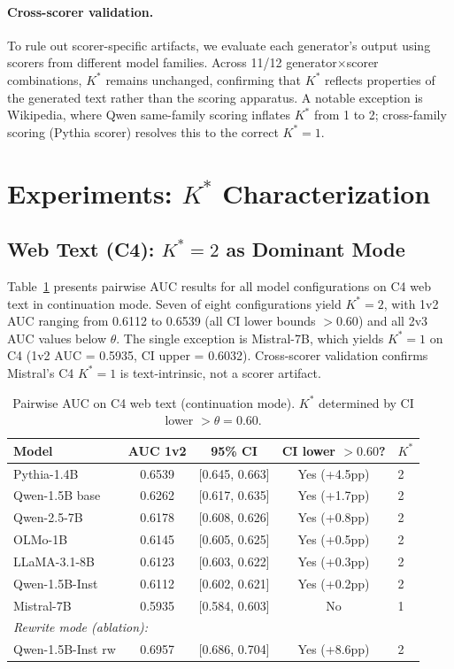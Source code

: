 \documentclass[11pt]{article}
\begin{document}
\paragraph{Cross-scorer validation.} To rule out scorer-specific artifacts, we evaluate each generator's output using scorers from different model families. Across 11/12 generator$\times$scorer combinations, $K^*$ remains unchanged, confirming that $K^*$ reflects properties of the generated text rather than the scoring apparatus. A notable exception is Wikipedia, where Qwen same-family scoring inflates $K^*$ from 1 to 2; cross-family scoring (Pythia scorer) resolves this to the correct $K^*{=}1$.

\section{Experiments: $K^*$ Characterization}

\subsection{Web Text (C4): $K^*{=}2$ as Dominant Mode}

Table~\ref{tab:c4-kstar} presents pairwise AUC results for all model configurations on C4 web text in continuation mode. Seven of eight configurations yield $K^*{=}2$, with 1v2 AUC ranging from 0.6112 to 0.6539 (all CI lower bounds $> 0.60$) and all 2v3 AUC values below $\theta$. The single exception is Mistral-7B, which yields $K^*{=}1$ on C4 (1v2 AUC = 0.5935, CI upper = 0.6032). Cross-scorer validation confirms Mistral's C4 $K^*{=}1$ is text-intrinsic, not a scorer artifact.

\begin{table}[t]
\centering
\caption{Pairwise AUC on C4 web text (continuation mode). $K^*$ determined by CI lower $> \theta = 0.60$.}
\label{tab:c4-kstar}
\small
\begin{tabular}{lcccl}
\toprule
Model & AUC 1v2 & 95\% CI & CI lower $> 0.60$? & $K^*$ \\
\midrule
Pythia-1.4B & 0.6539 & [0.645, 0.663] & Yes (+4.5pp) & 2 \\
Qwen-1.5B base & 0.6262 & [0.617, 0.635] & Yes (+1.7pp) & 2 \\
Qwen-2.5-7B & 0.6178 & [0.608, 0.626] & Yes (+0.8pp) & 2 \\
OLMo-1B & 0.6145 & [0.605, 0.625] & Yes (+0.5pp) & 2 \\
LLaMA-3.1-8B & 0.6123 & [0.603, 0.622] & Yes (+0.3pp) & 2 \\
Qwen-1.5B-Inst & 0.6112 & [0.602, 0.621] & Yes (+0.2pp) & 2 \\
Mistral-7B & 0.5935 & [0.584, 0.603] & No & 1 \\
\midrule
\multicolumn{5}{l}{\textit{Rewrite mode (ablation):}} \\
Qwen-1.5B-Inst rw & 0.6957 & [0.686, 0.704] & Yes (+8.6pp) & 2 \\
\bottomrule
\end{tabular}
\end{table}
\end{document}
